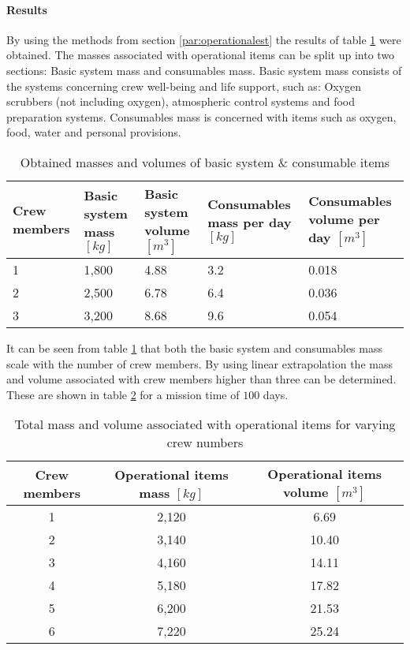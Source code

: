 \paragraph{Results}
By using the methods from section \ref{par:operationalest} the results of table \ref{tab:operationalest} were obtained.
The masses associated with operational items can be split up into two sections: Basic system mass and consumables mass. Basic system mass consists of the systems concerning crew well-being and life support, such as: Oxygen scrubbers (not including oxygen), atmospheric control systems and food preparation systems. Consumables mass is concerned with items such as oxygen, food, water and personal provisions.
\begin{table}[h]
	\centering
	\caption{Obtained masses and volumes of basic system \& consumable items}
	\begin{tabular}{|p{2cm}|p{2cm}|p{2cm}|p{2.5cm}|p{2.5cm}|}
		\hline
		\textbf{Crew members} & \textbf{Basic system mass $[kg]$} & \textbf{Basic system volume $[m^{3}]$} & \textbf{Consumables mass per day $[kg]$} & \textbf{Consumables volume per day $[m^{3}]$} \\ \hline \hline
		1 & 1,800 & 4.88 & 3.2 & 0.018 \\
		2 & 2,500 & 6.78 & 6.4 & 0.036 \\
		3 & 3,200 & 8.68 & 9.6 & 0.054 \\
		\hline
	\end{tabular}
	\label{tab:operationalest}
\end{table}
It can be seen from table \ref{tab:operationalest} that both the basic system and consumables mass scale with the number of crew members. By using linear extrapolation the mass and volume associated with crew members higher than three can be determined. These are shown in table \ref{tab:crewmemberops} for a mission time of $100$ days.

\begin{table}[h]
	\caption{Total mass and volume associated with operational items for varying crew numbers}
	\begin{tabular}{|c|c|c|}
		\hline
		\textbf{Crew members} & \textbf{Operational items mass $[kg]$} & \textbf{Operational items volume $[m^{3}]$}\\ \hline \hline
		1 & 2,120 & 6.69\\
		2 & 3,140 & 10.40\\
		3 & 4,160 & 14.11\\
		4 & 5,180 & 17.82\\
		5 & 6,200 & 21.53\\
		6 & 7,220 & 25.24\\ \hline
	\end{tabular}
	\label{tab:crewmemberops}
\end{table}